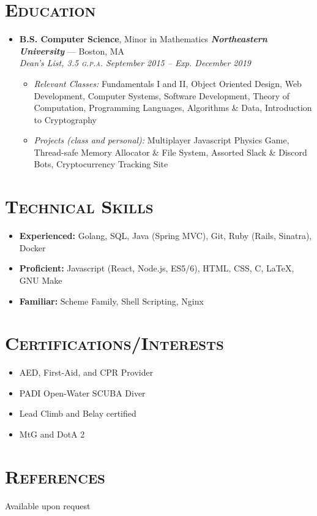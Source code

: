 \documentclass{article}
\begin{document}
\section*{\textsc{Education}}
\begin{itemize}[label={},leftmargin=*]
  \item \textbf{B.S. Computer Science}, Minor in Mathematics \hfill \textit{\textbf{Northeastern University}} --- Boston, MA \\
  \em{Dean's List}, 3.5 \textsc{g.p.a.}  \hfill \em{\textit{September 2015 -- Exp. December 2019}}
  \begin{itemize}
    \item[] \textit{Relevant Classes:} Fundamentals I and II, Object Oriented Design, Web Development, Computer Systems, Software Development, Theory of Computation, Programming Languages, Algorithms \& Data, Introduction to Cryptography\\
    \item[] \textit{Projects (class and personal):} Multiplayer Javascript Physics Game, Thread-safe Memory Allocator \& File System, Assorted Slack \& Discord Bots, Cryptocurrency Tracking Site
  \end{itemize}
\end{itemize}

\section*{\textsc{Technical Skills}}
\begin{itemize}[label={},leftmargin=*]
  \item \textbf{Experienced:} Golang, SQL, Java (Spring MVC), Git, Ruby (Rails, Sinatra), Docker
  \item \textbf{Proficient:} Javascript (React, Node.js, ES5/6), HTML, CSS, C, LaTeX, GNU Make
  \item \textbf{Familiar:} Scheme Family, Shell Scripting, Nginx
\end{itemize}

\section*{\textsc{Certifications/Interests}}
\begin{multicols}{2}
  \begin{itemize}[label={$\bullet$}]
    \item AED, First-Aid, and CPR Provider
    \item PADI Open-Water SCUBA Diver
    \item Lead Climb and Belay certified
    \item MtG and DotA 2
  \end{itemize}
\end{multicols}

\section*{\textsc{References}}
Available upon request
\end{document}

